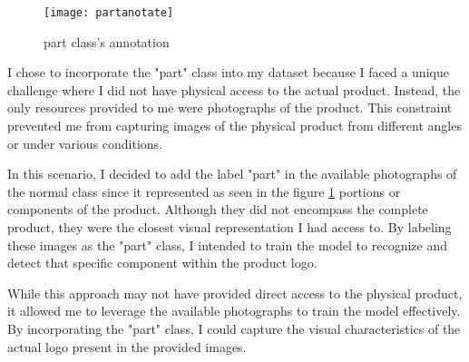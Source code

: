 \begin{figure}[htbp]
    \centering
    
    \begin{minipage}{1\textwidth}
        \centering
        \texttt{[image: partanotate]}
        \caption{part class's annotation}
        \label{fig:image3}
    \end{minipage}
\end{figure}
I chose to incorporate the "part" class into my dataset because I faced a unique challenge where I did not have physical access to the actual product. Instead, the only resources provided to me were photographs of the product. This constraint prevented me from capturing images of the physical product from different angles or under various conditions.

In this scenario, I decided to add the label "part" in the available photographs of the normal class since it represented as seen in the figure \ref{fig:image3} portions or components of the product. Although they did not encompass the complete product, they were the closest visual representation I had access to. By labeling these images as the "part" class, I intended to train the model to recognize and detect that specific component within the product logo.

While this approach may not have provided direct access to the physical product, it allowed me to leverage the available photographs to train the model effectively. By incorporating the "part" class, I could capture the visual characteristics of the actual logo present in the provided images. 
\FloatBarrier

